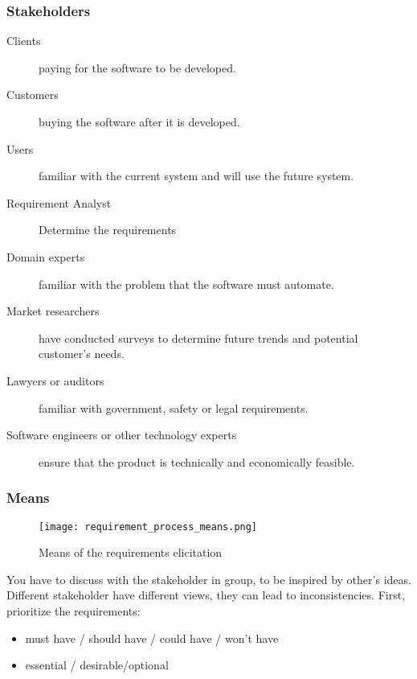 \subsubsection{Stakeholders}

\begin{description}
    \item[Clients] paying for the software to be developed.
    \item[Customers] buying the software after it is developed.
    \item[Users] familiar with the current system and will use the future system.
    \item[Requirement Analyst] Determine the requirements
    \item[Domain experts] familiar with the problem that the software must automate.
    \item[Market researchers] have conducted surveys to determine future trends and potential customer’s needs.
    \item[Lawyers or auditors] familiar with government, safety or legal requirements.
    \item[Software engineers or other technology experts] ensure that the product is technically and economically feasible.
\end{description}

\subsubsection{Means}

\begin{figure}[!ht]
    \centering
    \texttt{[image: requirement\_process\_means.png]}
    \caption{Means of the requirements elicitation}
\end{figure}


You have to discuss with the stakeholder in group, to be inspired by other’s ideas. Different
stakeholder have different views, they can lead to inconsistencies. First, prioritize the
requirements:
\begin{itemize}
	\item must have / should have / could have / won't have
	\item essential / desirable/optional
\end{itemize}

